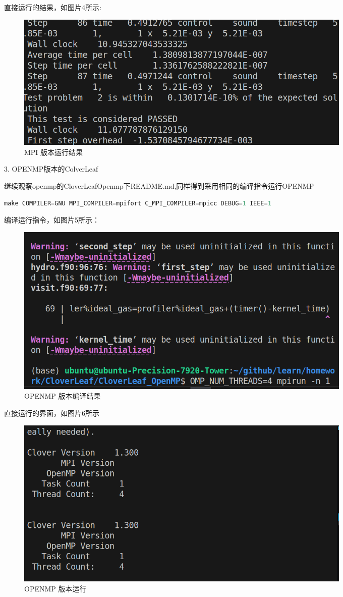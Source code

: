 \documentclass{article}
\begin{document}
\begin{CJK}{UTF8}{gbsn}
直接运行的结果，如图片4所示:
\begin{figure}[H]
    \centering
    \includegraphics[width=0.8\textwidth]{./MPI2.png}
    \caption{MPI 版本运行结果}
\end{figure}

3. OPENMP版本的ColverLeaf

继续观察openmp的CloverLeafOpenmp下README.md,同样得到采用相同的编译指令运行OPENMP
\begin{lstlisting}[language=C++]
    make COMPILER=GNU MPI_COMPILER=mpifort C_MPI_COMPILER=mpicc DEBUG=1 IEEE=1
\end{lstlisting} 
    编译运行指令，如图片5所示：
    
    \begin{figure}[H]
        \centering
        \includegraphics[width=0.8\textwidth]{./OPENMP1.png}
        \caption{OPENMP 版本编译结果}
    \end{figure} 
    
    直接运行的界面，如图片6所示
    \begin{figure}[H]
        \centering
        \includegraphics[width=0.8\textwidth]{./OPENMP2.png}
        \caption{OPENMP 版本运行}
    \end{figure}
    

\end{CJK}
\end{document}
